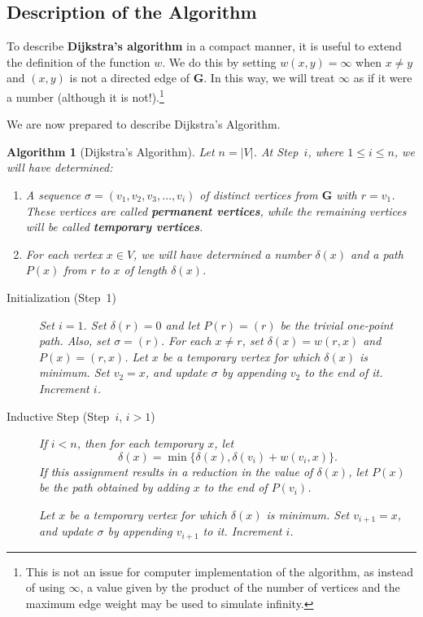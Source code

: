 \documentclass[10pt,]{book}
\newcommand{\terminology}[1]{\textbf{#1}}
\theoremstyle{plain}
\newtheorem{algorithm}[theorem]{Algorithm}
\theoremstyle{definition}
\theoremstyle{definition}
\theoremstyle{definition}
\theoremstyle{definition}
\numberwithin{equation}{section}
\newcommand{\bfG}{\mathbf{G}}
\newcommand{\lt}{<}
\begin{document}
\subsection[{Description of the Algorithm}]{Description of the Algorithm}\label{subsection-23}
\hypertarget{p-189}{}%
To describe \terminology{Dijkstra's algorithm} in a compact manner, it is useful to extend the definition of the function \(w\). We do this by setting \(w(x,y)=\infty\) when \(x\neq y\) and \((x,y)\) is not a directed edge of \(\bfG\). In this way, we will treat \(\infty\) as if it were a number (although it is not!).\footnote{This is not an issue for computer implementation of the algorithm, as instead of using \(\infty\), a value given by the product of the number of vertices and the maximum edge weight may be used to simulate infinity.\label{fn-1}}%
\par
\hypertarget{p-190}{}%
We are now prepared to describe Dijkstra's Algorithm.%
\begin{algorithm}[{Dijkstra's Algorithm}]\label{alg_dijkstra}
\hypertarget{p-191}{}%
Let \(n=|V|\). At Step~\(i\), where \(1\le i\le n\), we will have determined: \leavevmode%
\begin{enumerate}
\item\hypertarget{li-47}{}\hypertarget{p-192}{}%
A sequence \(\sigma=(v_1,v_2,v_3,\dots,v_i)\) of distinct vertices from \(\bfG\) with \(r=v_1\).  These vertices are called \terminology{permanent vertices}, while the remaining vertices will be called \terminology{temporary vertices}.%
\item\hypertarget{li-48}{}\hypertarget{p-193}{}%
For each vertex \(x\in V\), we will have determined a number \(\delta(x)\) and a path \(P(x)\) from \(r\) to \(x\) of length \(\delta(x)\).%
\end{enumerate}
 \leavevmode%
\begin{description}
\item[{Initialization (Step~1)}]\hypertarget{li-49}{}\hypertarget{p-194}{}%
Set \(i=1\). Set \(\delta(r)=0\) and let \(P(r)=(r)\) be the trivial one-point path. Also, set \(\sigma= (r)\). For each \(x\neq r\), set \(\delta(x)= w(r,x)\) and \(P(x)=(r,x)\). Let \(x\) be a temporary vertex for which \(\delta(x)\) is minimum. Set \(v_2 = x\), and update \(\sigma\) by appending \(v_2\) to the end of it. Increment \(i\).%
\item[{Inductive Step (Step~\(i\), \(i>1\))}]\hypertarget{li-50}{}\hypertarget{p-195}{}%
If \(i\lt n\), then for each temporary \(x\), let%
\begin{equation*}
\delta(x) = \min\{\delta(x), \delta(v_i)+w(v_i,x)\}.
\end{equation*}
If this assignment results in a reduction in the value of \(\delta(x)\), let \(P(x)\) be the path obtained by adding \(x\) to the end of \(P(v_i)\).%
\par
\hypertarget{p-196}{}%
Let \(x\) be a temporary vertex for which \(\delta(x)\) is minimum. Set \(v_{i+1}=x\), and update \(\sigma\) by appending \(v_{i+1}\) to it. Increment \(i\).%
\end{description}
%
\end{algorithm}
\end{document}
